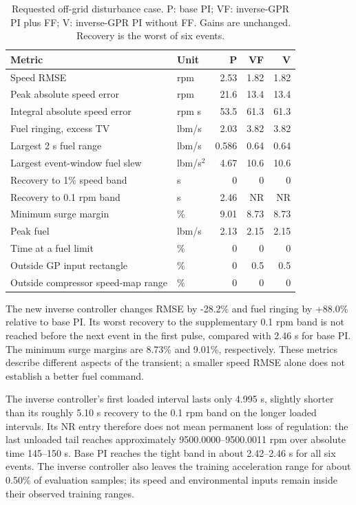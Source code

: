 \documentclass[11pt,a4paper]{article}
\begin{document}
\begin{table}[H]\centering\small
\setlength{\tabcolsep}{5pt}
\begin{tabular}{@{}llrrr@{}}\toprule
Metric & Unit & P & VF & V\\\midrule
Speed RMSE & rpm & 2.53 & 1.82 & 1.82\\
Peak absolute speed error & rpm & 21.6 & 13.4 & 13.4\\
Integral absolute speed error & rpm s & 53.5 & 61.3 & 61.3\\
Fuel ringing, excess TV & lbm/s & 2.03 & 3.82 & 3.82\\
Largest 2 s fuel range & lbm/s & 0.586 & 0.64 & 0.64\\
Largest event-window fuel slew & lbm/s$^2$ & 4.67 & 10.6 & 10.6\\
Recovery to 1\% speed band & s & 0 & 0 & 0\\
Recovery to 0.1 rpm band & s & 2.46 & NR & NR\\
Minimum surge margin & \% & 9.01 & 8.73 & 8.73\\
Peak fuel & lbm/s & 2.13 & 2.15 & 2.15\\
Time at a fuel limit & \% & 0 & 0 & 0\\
Outside GP input rectangle & \% & 0 & 0.5 & 0.5\\
Outside compressor speed-map range & \% & 0 & 0 & 0\\
\bottomrule\end{tabular}\caption{Requested off-grid disturbance case. P: base PI; VF: inverse-GPR PI plus FF; V: inverse-GPR PI without FF. Gains are unchanged. Recovery is the worst of six events.}\end{table}

The new inverse controller changes RMSE by -28.2\% and fuel ringing by +88.0\% relative to base PI. Its worst recovery to the supplementary 0.1 rpm band is not reached before the next event in the first pulse, compared with 2.46 s for base PI. The minimum surge margins are 8.73\% and 9.01\%, respectively. These metrics describe different aspects of the transient; a smaller speed RMSE alone does not establish a better fuel command.

The inverse controller's first loaded interval lasts only 4.995 s, slightly shorter than its roughly 5.10 s recovery to the 0.1 rpm band on the longer loaded intervals. Its NR entry therefore does not mean permanent loss of regulation: the last unloaded tail reaches approximately 9500.0000--9500.0011 rpm over absolute time 145--150 s. Base PI reaches the tight band in about 2.42--2.46 s for all six events. The inverse controller also leaves the training acceleration range for about 0.50\% of evaluation samples; its speed and environmental inputs remain inside their observed training ranges.
\end{document}
